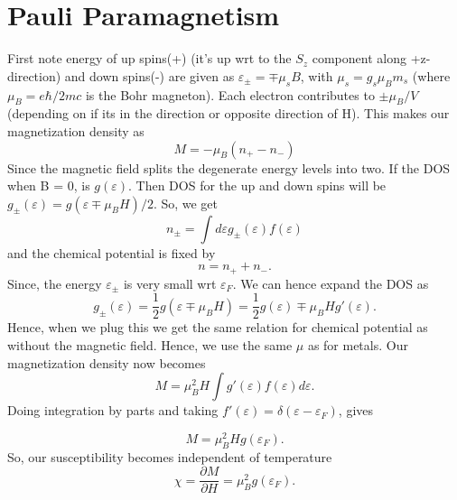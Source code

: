 \documentclass{article}
\begin{document}
	\section{Pauli Paramagnetism}
	First note energy of up spins(+) (it's up wrt to the $S_z$ component along +z-direction) and down spins(-) are given as $\varepsilon_{\pm} = \mp \mu_s B$, with $\mu_s = g_s \mu_B m_s $ (where $\mu_B = e\hbar/2mc$ is the Bohr magneton). Each electron contributes to $\pm \mu_B/V$ (depending on if its in the direction or opposite direction of H). This makes our magnetization density as
	\begin{equation}
		M = -\mu_B (n_+ - n_-)
	\end{equation}
	Since the magnetic field splits the degenerate energy levels into two. If the DOS when B = 0, is $g(\varepsilon)$. Then DOS for the up and down spins will be $g_{\pm} (\varepsilon) = g(\varepsilon \mp \mu_B H)/2$. So, we get
	\begin{equation}
		n_{\pm} = \int d\varepsilon g_{\pm}(\varepsilon)f(\varepsilon)
	\end{equation}                        
	and the chemical potential is fixed by
	\begin{equation}
		n = n_+ +n_- .
	\end{equation}
	Since, the energy $\varepsilon_{\pm}$ is very small wrt $\varepsilon_F$. We can hence expand the DOS as
	\begin{equation}
		g_{\pm} (\varepsilon) = \frac{1}{2} g(\varepsilon \mp \mu_B H) = \frac{1}{2} g(\varepsilon) \mp \mu_B H g'(\varepsilon).
	\end{equation}
	Hence, when we plug this we get the same relation for chemical potential as without the magnetic field. Hence, we use the same $\mu$ as for metals. Our magnetization density now becomes
	\begin{equation}
		M = \mu_B ^2 H \int g'(\varepsilon) f(\varepsilon) d\varepsilon .
	\end{equation}
	Doing integration by parts and taking $f'(\varepsilon) = \delta(\varepsilon-\varepsilon_F)$, gives
	
	\begin{equation}
		M = \mu_B ^2 H g(\varepsilon_F).
	\end{equation}
	So, our susceptibility becomes independent of temperature
	\begin{equation}
		\chi = \frac{\partial M}{\partial H} = \mu_B ^2 g(\varepsilon_F).
	\end{equation}
	
	
	
	
	
\end{document}
